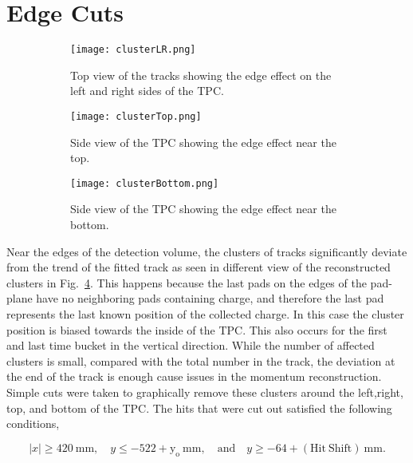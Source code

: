 \section{Edge Cuts}

\begin{figure}[!htb]

    \centering
    \begin{subfigure}[t]{0.45\textwidth}
        \centering
        \texttt{[image: clusterLR.png]} 
        \caption{Top view of the tracks showing the edge effect on the left and right sides of the TPC.} 	   \label{fig:clusterLR}
    \end{subfigure}
    \hfill
    \begin{subfigure}[t]{0.45\textwidth}
        \centering
        \texttt{[image: clusterTop.png]} 
        \caption{Side view of the TPC showing the edge effect near the top.} \label{fig:clusterTop}
    \end{subfigure}
    
    \begin{subfigure}[t]{0.45\textwidth}
        \centering
        \texttt{[image: clusterBottom.png]} 
        \caption{Side view of the TPC showing the edge effect near the bottom.} \label{fig:clusterBottom}
    \end{subfigure}
\caption{}    
\label{fig:edge}
\end{figure}

Near the edges of the detection volume, the clusters of tracks significantly deviate from the trend of the fitted track as seen in different view of the reconstructed clusters in Fig.~\ref{fig:edge}.  This happens because the last pads on the edges of the pad-plane have no neighboring pads containing charge, and therefore the last pad represents the last known position of the collected charge. In this case the cluster position is biased towards the inside of the TPC. This also occurs for the first and last time bucket in the vertical direction. While the number of affected clusters is small, compared with the total number in the track, the deviation at the end of the track is enough cause issues in the momentum reconstruction. Simple cuts were taken to graphically remove these clusters around the left,right, top, and bottom of the TPC. The hits that were cut out satisfied the following conditions, 

\begin{equation*}
  |x|\geq420~\mathrm{mm},\quad y\leq-522+\mathrm{y_o}~\mathrm{mm},
  \quad\mathrm{and}\quad y\geq-64+\mathrm{(Hit\ Shift)}~\mathrm{mm}.
\label{eq:hitshift}
\end{equation*}



